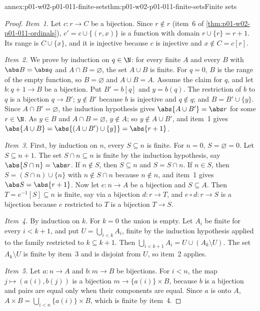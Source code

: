 \begin{annexitem}{annex:p01-w02-p01-011-finite-sets}{thm:p01-w02-p01-011-finite-sets}{Finite sets}
\begin{proof}
\emph{Item~1.} Let \(c:r\to C\) be a bijection. Since \(r\notin r\)
(item~6 of \cref{thm:p01-w02-p01-011-ordinals}),
\(c'=c\cup\{(r,x)\}\) is a function with domain \(r\cup\{r\}=r+1\). Its
range is \(C\cup\{x\}\), and it is injective because \(c\) is injective and
\(x\notin C=c[r]\).

\emph{Item~2.} We prove by induction on \(q\in\N\): for every finite \(A\)
and every \(B\) with \(\abs B=\abs q\) and \(A\cap B=\varnothing\), the set
\(A\cup B\) is finite. For \(q=0\), \(B\) is the range of the empty function,
so \(B=\varnothing\) and \(A\cup B=A\). Assume the claim for \(q\), and let
\(b:q+1\to B\) be a bijection. Put \(B'=b[q]\) and \(y=b(q)\). The
restriction of \(b\) to \(q\) is a bijection \(q\to B'\); \(y\notin B'\)
because \(b\) is injective and \(q\notin q\); and \(B=B'\cup\{y\}\). Since
\(A\cap B'=\varnothing\), the induction hypothesis gives
\(\abs{A\cup B'}=\abs r\) for some \(r\in\N\). As \(y\in B\) and
\(A\cap B=\varnothing\), \(y\notin A\); so \(y\notin A\cup B'\), and item~1
gives \(\abs{A\cup B}=\abs{(A\cup B')\cup\{y\}}=\abs{r+1}\).

\emph{Item~3.} First, by induction on \(n\), every \(S\subseteq n\) is
finite. For \(n=0\), \(S=\varnothing=0\). Let \(S\subseteq n+1\). The set
\(S\cap n\subseteq n\) is finite by the induction hypothesis, say
\(\abs{S\cap n}=\abs r\). If \(n\notin S\), then \(S\subseteq n\) and
\(S=S\cap n\). If \(n\in S\), then \(S=(S\cap n)\cup\{n\}\) with
\(n\notin S\cap n\) because \(n\notin n\), and item~1 gives
\(\abs S=\abs{r+1}\). Now let \(e:n\to A\) be a bijection and
\(S\subseteq A\). Then \(T=e^{-1}[S]\subseteq n\) is finite, say via a
bijection \(d:r\to T\), and \(e\circ d:r\to S\) is a bijection because
\(e\) restricted to \(T\) is a bijection \(T\to S\).

\emph{Item~4.} By induction on \(k\). For \(k=0\) the union is empty. Let
\(A_i\) be finite for every \(i<k+1\), and put
\(U=\bigcup_{i<k}A_i\), finite by the induction hypothesis applied to the
family restricted to \(k\subseteq k+1\). Then
\(\bigcup_{i<k+1}A_i=U\cup(A_k\setminus U)\). The set \(A_k\setminus U\) is
finite by item~3 and is disjoint from \(U\), so item~2 applies.

\emph{Item~5.} Let \(a:n\to A\) and \(b:m\to B\) be bijections. For
\(i<n\), the map \(j\mapsto(a(i),b(j))\) is a bijection
\(m\to\{a(i)\}\times B\), because \(b\) is a bijection and pairs are equal
only when their components are equal. Since \(a\) is onto \(A\),
\(A\times B=\bigcup_{i<n}\{a(i)\}\times B\), which is finite by item~4.
\end{proof}
\end{annexitem}

